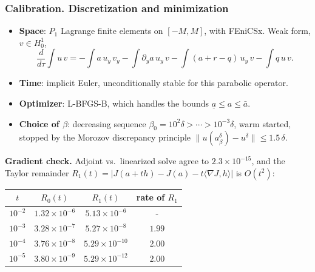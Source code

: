 \begin{frame}
\frametitle{Calibration. Discretization and minimization}
\begin{scriptsize}
\begin{itemize}
\item \textbf{Space}: $P_1$ Lagrange finite elements on $[-M, M]$, with FEniCSx. Weak form, $v \in H^1_0$,
\begin{equation*}
    \frac{d}{d\tau}\!\int u\,v
    = -\!\int a\,u_y\,v_y
      -\!\int \partial_y a\,u_y\,v
      -\!\int (a + r - q)\,u_y\,v
      -\!\int q\,u\,v .
\end{equation*}
\item \textbf{Time}: implicit Euler, unconditionally stable for this parabolic operator.
\item \textbf{Optimizer}: L-BFGS-B, which handles the bounds $\underline{a} \le a \le \bar a$.
\item \textbf{Choice of $\beta$}: decreasing sequence $\beta_0 = 10^{2}\delta > \cdots > 10^{-3}\delta$,
warm started, stopped by the Morozov discrepancy principle $\|u(a^\delta_\beta) - u^\delta\| \le 1.5\,\delta$.
\end{itemize}

\textbf{Gradient check.} Adjoint vs.\ linearized solve agree to $2.3\times10^{-15}$,
and the Taylor remainder $R_1(t) = |J(a+th) - J(a) - t\langle\nabla J, h\rangle|$ is $O(t^2)$:
\begin{center}
\begin{tabular}{c c c c}
\toprule
$t$ & $R_0(t)$ & $R_1(t)$ & rate of $R_1$ \\
\midrule
$10^{-2}$ & $1.32\times10^{-6}$ & $5.13\times10^{-6}$ & - \\
$10^{-3}$ & $3.28\times10^{-7}$ & $5.27\times10^{-8}$ & $1.99$ \\
$10^{-4}$ & $3.76\times10^{-8}$ & $5.29\times10^{-10}$ & $2.00$ \\
$10^{-5}$ & $3.80\times10^{-9}$ & $5.29\times10^{-12}$ & $2.00$ \\
\bottomrule
\end{tabular}
\end{center}
\end{scriptsize}
\end{frame}
